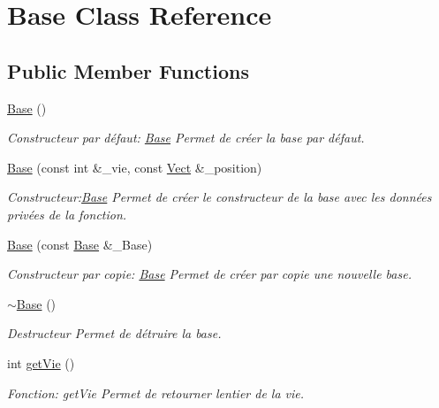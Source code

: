 \hypertarget{classBase}{}\section{Base Class Reference}
\label{classBase}
\subsection*{Public Member Functions}
\begin{DoxyCompactItemize}
\item 
\hyperlink{classBase_a5ffe0568374d8b9b4c4ec32953fd6453}{Base} ()
\begin{DoxyCompactList}\small\item\em Constructeur par défaut\+: \hyperlink{classBase}{Base} Permet de créer la base par défaut. \end{DoxyCompactList}\item 
\hyperlink{classBase_aa56feb99f89924004cbb864cce83ccc0}{Base} (const int \&\+\_\+vie, const \hyperlink{classVect}{Vect} \&\+\_\+position)
\begin{DoxyCompactList}\small\item\em Constructeur\+:\hyperlink{classBase}{Base} Permet de créer le constructeur de la base avec les données privées de la fonction. \end{DoxyCompactList}\item 
\hyperlink{classBase_a8520b7acb2f08e4c892a7ea3213539a7}{Base} (const \hyperlink{classBase}{Base} \&\+\_\+\+Base)
\begin{DoxyCompactList}\small\item\em Constructeur par copie\+: \hyperlink{classBase}{Base} Permet de créer par copie une nouvelle base. \end{DoxyCompactList}\item 
\mbox{\label{classBase_a722da881b6c70cfcbde9243abcfbf334}} 
\hyperlink{classBase_a722da881b6c70cfcbde9243abcfbf334}{$\sim$\+Base} ()
\begin{DoxyCompactList}\small\item\em Destructeur Permet de détruire la base. \end{DoxyCompactList}\item 
int \hyperlink{classBase_a922b45a3578821dd6ab666206b1a637e}{get\+Vie} ()
\begin{DoxyCompactList}\small\item\em Fonction\+: get\+Vie Permet de retourner l\textquotesingle{}entier de la vie. \end{DoxyCompactList}\item 

\end{DoxyCompactItemize}
